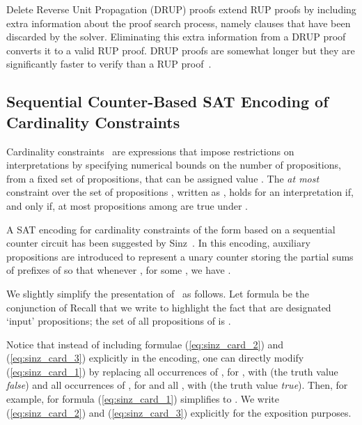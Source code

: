 \documentclass{article} \usepackage[utf8]{inputenc}
\begin{document}
Delete Reverse Unit Propagation (DRUP) proofs extend  RUP proofs by including
extra information about the proof search process, namely clauses that have been
discarded by the solver.  Eliminating this extra information from a DRUP proof
converts it to a valid RUP proof.  DRUP proofs are somewhat longer but they are
significantly faster to verify than a RUP proof~\cite{druptrim}. 


\subsection{Sequential Counter-Based SAT Encoding of Cardinality Constraints}\label{sec:sinz_card}
Cardinality constraints~\cite{cardconstrHB} are expressions that impose restrictions on
interpretations by specifying numerical bounds on the number of propositions,
from a fixed set of propositions, that can be assigned value . The \emph{at
most } constraint over the set of propositions , written
as , holds for an interpretation  if, and only if,
at most  propositions among  are true under .

A SAT encoding for cardinality constraints of the
form  based on a sequential counter circuit has been
suggested by Sinz~. In this encoding, auxiliary propositions
 are introduced to represent a unary counter storing the partial sums
of prefixes of  so that whenever , for
some , we have .  


We slightly simplify the presentation of~\cite{Sinz05} as follows.
Let formula 
be the conjunction of 
Recall that we write  to highlight the fact that 
 are designated `input' propositions; the set of 
all propositions 
of  is
.

Notice that instead of including formulae (\ref{eq:sinz_card_2}) and
(\ref{eq:sinz_card_3}) explicitly in the encoding, one can directly
modify (\ref{eq:sinz_card_1}) by replacing  
all occurrences of , for , with  (the truth
value \emph{false}) and all occurrences of , for  and all 
, with  (the truth value \emph{true}).
Then, for example, for  formula (\ref{eq:sinz_card_1}) simplifies to
. We write (\ref{eq:sinz_card_2}) and
(\ref{eq:sinz_card_3})  explicitly for the exposition purposes.
\end{document}
